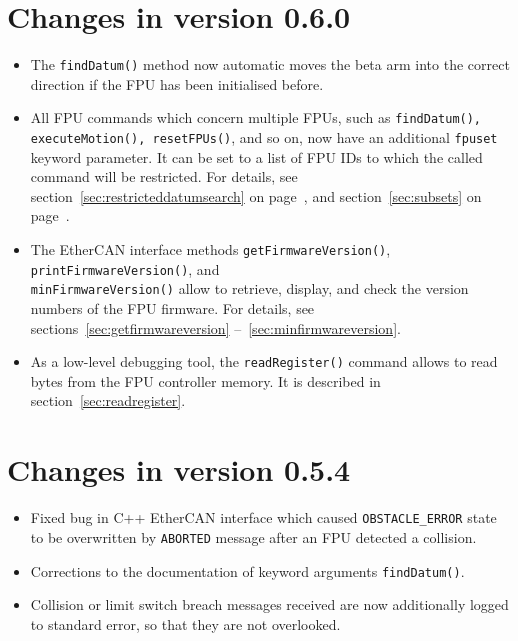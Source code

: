 \documentclass[fontsize=12,a4paper]{scrreprt}
\begin{document}
\section*{Changes in version 0.6.0}
\begin{itemize}
\item The \texttt{findDatum()} method now automatic moves the beta
  arm into the correct direction if the FPU has been initialised before.

\item All FPU commands which concern multiple FPUs, such as
  \texttt{findDatum(), executeMotion(), resetFPUs()}, and so on, now
  have an additional \texttt{fpuset} keyword parameter. It can be set
  to a list of FPU IDs to which the called command will be
  restricted. For details, see section~\ref{sec:restricteddatumsearch}
  on page~\pageref{sec:restricteddatumsearch}, and
  section~\ref{sec:subsets} on page~\pageref{sec:subsets}.

\item The EtherCAN interface methods \texttt{getFirmwareVersion()},
  \texttt{printFirmwareVersion()}, and \\
  \texttt{minFirmwareVersion()}
  allow to retrieve, display, and check the version numbers of the FPU
  firmware. For details, see sections~\ref{sec:getfirmwareversion}
    --~\ref{sec:minfirmwareversion}.

\item As a low-level debugging tool, the \texttt{readRegister()}
  command allows to read bytes from the FPU controller memory.  It is
  described in section~\ref{sec:readregister}.

\end{itemize}



\section*{Changes in version 0.5.4}
\begin{itemize}
\item Fixed bug in C++ EtherCAN interface which caused \texttt{OBSTACLE\_ERROR}
  state to be overwritten by \texttt{ABORTED} message after an FPU
  detected a collision.
\item Corrections to the documentation of keyword arguments \texttt{findDatum()}.
\item Collision or limit switch breach messages received are now
  additionally logged to standard error, so that they are not overlooked.
\end{itemize}
\end{document}
